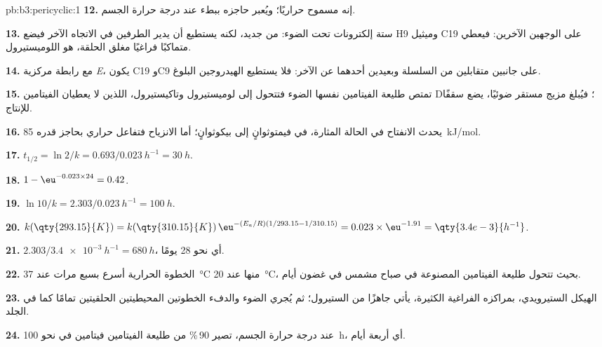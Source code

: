 \begin{solution}{pb:b3:pericyclic:1}
\textbf{12.} إنه مسموح حراريًا؛ ويُعبر حاجزه ببطء عند درجة حرارة الجسم.

\textbf{13.} ستة إلكترونات تحت الضوء:  من جديد، لكنه يستطيع أن يدير الطرفين في
الاتجاه الآخر فيضع H9 وميثيل C19 على الوجهين الآخرين: فيعطي متماكبًا فراغيًا
مغلق الحلقة، هو اللوميستيرول.

\textbf{14.} مع رابطة مركزية \textit{E}، يكون C19 وC9 على جانبين متقابلين من السلسلة وبعيدين
أحدهما عن الآخر: فلا يستطيع الهيدروجين البلوغ.

\textbf{15.} تمتص طليعة الفيتامين  نفسها الضوء فتتحول إلى لوميستيرول وتاكيستيرول،
اللذين لا يعطيان الفيتامين D؛ فيُبلغ مزيج مستقر ضوئيًا، يضع سقفًا
للإنتاج.

\textbf{16.} يحدث الانفتاح في الحالة المثارة، في فيمتوثوانٍ إلى بيكوثوانٍ؛ أما
الانزياح فتفاعل حراري بحاجز قدره \qty{85}{kJ/mol}.

\textbf{17.} $t_{1/2} = \ln 2/k = 0.693/\qty{0.023}{h^{-1}} = \qty{30}{h}$.

\textbf{18.} $1 - \eu^{-0.023 \times 24} = 0.42$.

\textbf{19.} $\ln 10/k = 2.303/\qty{0.023}{h^{-1}} = \qty{100}{h}$.

\textbf{20.} $k(\qty{293.15}{K}) = k(\qty{310.15}{K})\,\eu^{-(E_a/R)(1/293.15 - 1/310.15)} = 0.023 \times \eu^{-1.91} = \qty{3.4e-3}{h^{-1}}$.

\textbf{21.} $2.303/\qty{3.4e-3}{h^{-1}} = \qty{680}{h}$، أي نحو 28 يومًا.

\textbf{22.} الخطوة الحرارية أسرع بسبع مرات عند \qty{37}{\celsius} منها عند \qty{20}{\celsius}، بحيث تتحول
طليعة الفيتامين المصنوعة في صباح مشمس في غضون أيام.

\textbf{23.} الهيكل الستيرويدي، بمراكزه الفراغية الكثيرة، يأتي جاهزًا من
الستيرول؛ ثم يُجري الضوء والدفء الخطوتين المحيطيتين الحلقيتين تمامًا كما في
الجلد.

\textbf{24.} عند درجة حرارة الجسم، تصير 90\,\% من طليعة الفيتامين  فيتامين  في نحو
\qty{100}{h}، أي أربعة أيام.
\end{solution}

